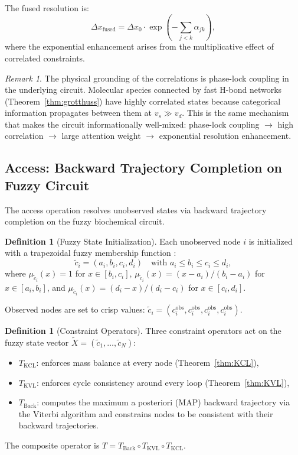 \documentclass[twocolumn,10pt,a4paper]{article}
\theoremstyle{definition}
\newtheorem{definition}[theorem]{Definition}
\theoremstyle{remark}
\newtheorem{remark}[theorem]{Remark}
\begin{document}
The fused resolution is:
\begin{equation}
    \Delta x_{\mathrm{fused}} = \Delta x_0 \cdot \exp\!\left(-\sum_{j<k} \alpha_{jk}\right),
\end{equation}
where the exponential enhancement arises from the multiplicative effect of correlated constraints.

\begin{remark}
The physical grounding of the correlations is phase-lock coupling in the underlying circuit. Molecular species connected by fast H-bond networks (Theorem~\ref{thm:grotthuss}) have highly correlated states because categorical information propagates between them at $v_s \gg v_d$. This is the same mechanism that makes the circuit informationally well-mixed: phase-lock coupling $\to$ high correlation $\to$ large attention weight $\to$ exponential resolution enhancement.
\end{remark}

\subsection{Access: Backward Trajectory Completion on Fuzzy Circuit}
\label{sec:access}

The access operation resolves unobserved states via backward trajectory completion on the fuzzy biochemical circuit.

\begin{definition}[Fuzzy State Initialization]
\label{def:fuzzy_init}
Each unobserved node $i$ is initialized with a trapezoidal fuzzy membership function \citep{Zadeh1965}:
\begin{equation}
    \tilde{c}_i = (a_i, b_i, c_i, d_i) \quad \text{with } a_i \leq b_i \leq c_i \leq d_i,
\end{equation}
where $\mu_{\tilde{c}_i}(x) = 1$ for $x \in [b_i, c_i]$, $\mu_{\tilde{c}_i}(x) = (x-a_i)/(b_i-a_i)$ for $x \in [a_i, b_i]$, and $\mu_{\tilde{c}_i}(x) = (d_i-x)/(d_i-c_i)$ for $x \in [c_i, d_i]$.

Observed nodes are set to crisp values: $\tilde{c}_i = (c_i^{\mathrm{obs}}, c_i^{\mathrm{obs}}, c_i^{\mathrm{obs}}, c_i^{\mathrm{obs}})$.
\end{definition}

\begin{definition}[Constraint Operators]
\label{def:constraint_ops}
Three constraint operators act on the fuzzy state vector $\tilde{X} = (\tilde{c}_1, \ldots, \tilde{c}_N)$:
\begin{itemize}[nosep]
    \item $T_{\mathrm{KCL}}$: enforces mass balance at every node (Theorem~\ref{thm:KCL}),
    \item $T_{\mathrm{KVL}}$: enforces cycle consistency around every loop (Theorem~\ref{thm:KVL}),
    \item $T_{\mathrm{Back}}$: computes the maximum a posteriori (MAP) backward trajectory via the Viterbi algorithm \citep{Viterbi1967} and constrains nodes to be consistent with their backward trajectories.
\end{itemize}
The composite operator is $T = T_{\mathrm{Back}} \circ T_{\mathrm{KVL}} \circ T_{\mathrm{KCL}}$.
\end{definition}
\end{document}
